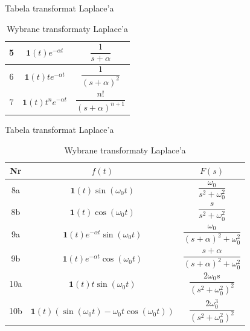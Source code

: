 \begin{frame}{Tabela transformat Laplace'a}
	\begin{table}
		\centering
		\caption{Wybrane transformaty Laplace'a}
		\begin{tabular}{|c|c|c|}
			\hline
			5 & $\mathbf{1}(t) e^{-\alpha t}$     & $\dfrac{1}{s+\alpha}$          \\[1ex]
			\hline
			6 & $\mathbf{1}(t) t e^{-\alpha t}$   & $\dfrac{1}{(s+\alpha)^2}$      \\[1ex]
			\hline
			7 & $\mathbf{1}(t) t^n e^{-\alpha t}$ & $\dfrac{n!}{(s+\alpha)^{n+1}}$ \\[1ex]
			\hline
		\end{tabular}
	\end{table}
\end{frame}


\begin{frame}{Tabela transformat Laplace'a}
	\begin{table}
		\centering
		\caption{Wybrane transformaty Laplace'a}
		\begin{tabular}{|c|c|c|}
			\hline
			Nr  & $f(t)$                                                                        & $F(s)$                                      \\[1ex]
			\hline
			8a  & $\mathbf{1}(t) \sin(\omega_0 t)$                                              & $\dfrac{\omega_0}{s^2+\omega_0^2}$          \\[1ex]
			\hline
			8b  & $\mathbf{1}(t) \cos(\omega_0 t)$                                              & $\dfrac{s}{s^2+\omega_0^2}$                 \\[1ex]
			\hline
			9a  & $\mathbf{1}(t) e^{-\alpha t} \sin(\omega_0 t)$                                & $\dfrac{\omega_0}{(s+\alpha)^2+\omega_0^2}$ \\[1ex]
			\hline
			9b  & $\mathbf{1}(t) e^{-\alpha t} \cos(\omega_0 t)$                                & $\dfrac{s+\alpha}{(s+\alpha)^2+\omega_0^2}$ \\[1ex]
			\hline
			10a & $\mathbf{1}(t) t \sin(\omega_0 t)$                                            & $\dfrac{2 \omega_0 s}{(s^2+\omega_0^2)^2}$  \\[1ex]
			\hline
			10b & $\mathbf{1}(t) \left( \sin(\omega_0 t) - \omega_0 t \cos(\omega_0 t) \right)$ & $\dfrac{2 \omega_0^3}{(s^2+\omega_0^2)^2}$  \\[1ex]
			\hline
		\end{tabular}
	\end{table}
\end{frame}

